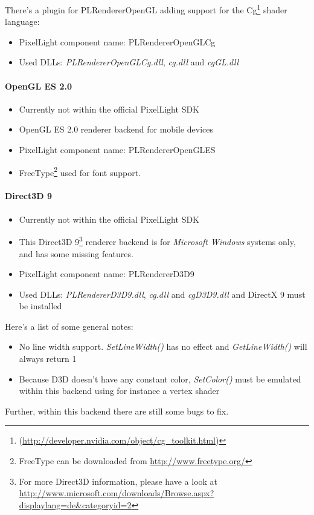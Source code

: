 There's a plugin for PLRendererOpenGL adding support for the Cg\footnote{(\url{http://developer.nvidia.com/object/cg_toolkit.html})} shader language:
\begin{itemize}
\item PixelLight component name: PLRendererOpenGLCg
\item Used \ac{DLL}s: \emph{PLRendererOpenGLCg.dll}, \emph{cg.dll} and \emph{cgGL.dll}
\end{itemize}


\paragraph{OpenGL ES 2.0}
\begin{itemize}
\item Currently not within the official PixelLight \ac{SDK}
\item OpenGL ES 2.0 renderer backend for mobile devices
\item PixelLight component name: PLRendererOpenGLES
\item FreeType\footnote{FreeType can be downloaded from \url{http://www.freetype.org/}} used for font support.
\end{itemize}


\paragraph{Direct3D 9}
\begin{itemize}
\item Currently not within the official PixelLight \ac{SDK}
\item This Direct3D 9\footnote{For more Direct3D information, please have a look at \url{http://www.microsoft.com/downloads/Browse.aspx?displaylang=de&categoryid=2}} renderer backend is for \emph{Microsoft Windows} systems only, and has some missing features.
\item PixelLight component name: PLRendererD3D9
\item Used \ac{DLL}s: \emph{PLRendererD3D9.dll}, \emph{cg.dll} and \emph{cgD3D9.dll} and DirectX 9 must be installed
\end{itemize}

Here's a list of some general notes:
\begin{itemize}
\item No line width support. \emph{SetLineWidth()} has no effect and \emph{GetLineWidth()} will always return 1
\item Because D3D doesn't have any constant color, \emph{SetColor()} must be emulated within this backend using for instance a vertex shader
\end{itemize}
Further, within this backend there are still some bugs to fix.


